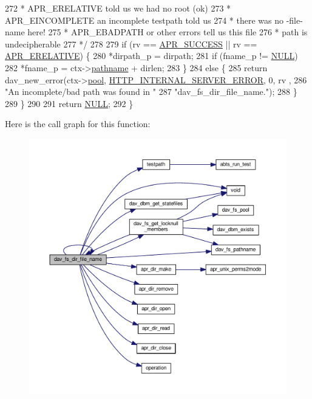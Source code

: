 \begin{DoxyCode}
272 \textcolor{comment}{         * APR\_ERELATIVE   told us we had no root (ok)}
273 \textcolor{comment}{         * APR\_EINCOMPLETE an incomplete testpath told us}
274 \textcolor{comment}{         *                 there was no -file- name here!}
275 \textcolor{comment}{         * APR\_EBADPATH    or other errors tell us this file}
276 \textcolor{comment}{         *                 path is undecipherable}
277 \textcolor{comment}{         */}
278 
279         \textcolor{keywordflow}{if} (rv == \hyperlink{group__apr__errno_ga9ee311b7bf1c691dc521d721339ee2a6}{APR\_SUCCESS} || rv == \hyperlink{group__APR__Error_gae4688dfa866265b9ec3623689c23923b}{APR\_ERELATIVE}) \{
280             *dirpath\_p = dirpath;
281             \textcolor{keywordflow}{if} (fname\_p != \hyperlink{pcre_8txt_ad7f989d16aa8ca809a36bc392c07fba1}{NULL})
282                 *fname\_p = ctx->\hyperlink{structdav__resource__private_a9221c2df9f33ac585e096b6a6963cf27}{pathname} + dirlen;
283         \}
284         \textcolor{keywordflow}{else} \{
285             \textcolor{keywordflow}{return} dav\_new\_error(ctx->\hyperlink{structdav__resource__private_ad180911d49f61626aef32667f087fa33}{pool}, \hyperlink{group__HTTP__Status_ga5d9777e02c26063c2985e39ef71091d2}{HTTP\_INTERNAL\_SERVER\_ERROR}, 0, rv
      ,
286                                  \textcolor{stringliteral}{"An incomplete/bad path was found in "}
287                                  \textcolor{stringliteral}{"dav\_fs\_dir\_file\_name."});
288         \}
289     \}
290 
291     \textcolor{keywordflow}{return} \hyperlink{pcre_8txt_ad7f989d16aa8ca809a36bc392c07fba1}{NULL};
292 \}
\end{DoxyCode}


Here is the call graph for this function\+:
\nopagebreak
\begin{figure}[H]
\begin{center}
\leavevmode
\includegraphics[width=350pt]{group__MOD__DAV_gae96904b2aaf9fa143f7458db22e61e77_cgraph}
\end{center}
\end{figure}




